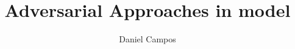 \documentclass[]{article}
\title{Adversarial Approaches in model}
\author{Daniel Campos}
\begin{document}
\maketitle

\begin{abstract}

\end{abstract}

\section{}
\end{document}
